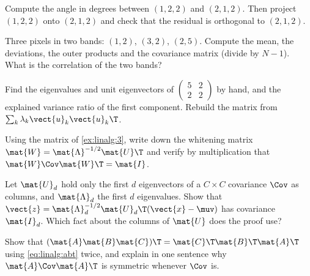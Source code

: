\begin{checkyourself}
\item\label{ex:linalg:1} Compute the angle in degrees between $(1, 2, 2)$ and $(2, 1, 2)$. Then
  project $(1, 2, 2)$ onto $(2, 1, 2)$ and check that the residual is orthogonal to $(2, 1, 2)$.
\item\label{ex:linalg:2} Three pixels in two bands: $(1, 2)$, $(3, 2)$, $(2, 5)$. Compute the
  mean, the deviations, the outer products and the covariance matrix (divide by $N - 1$). What is
  the correlation of the two bands?
\item\label{ex:linalg:3} Find the eigenvalues and unit eigenvectors of
  $\begin{pmatrix} 5 & 2\\ 2 & 2\end{pmatrix}$ by hand, and the explained variance ratio of the
  first component. Rebuild the matrix from $\sum_k \lambda_k\vect{u}_k\vect{u}_k\T$.
\item\label{ex:linalg:4} Using the matrix of \cref{ex:linalg:3}, write down the whitening matrix
  $\mat{W} = \mat{\Lambda}^{-1/2}\mat{U}\T$ and verify by multiplication that
  $\mat{W}\Cov\mat{W}\T = \mat{I}$.
\item\label{ex:linalg:5} Let $\mat{U}_d$ hold only the first $d$ eigenvectors of a $C\times C$
  covariance $\Cov$ as columns, and $\mat{\Lambda}_d$ the first $d$ eigenvalues. Show that
  $\vect{z} = \mat{\Lambda}_d^{-1/2}\mat{U}_d\T(\vect{x} - \muv)$ has covariance $\mat{I}_d$. Which
  fact about the columns of $\mat{U}$ does the proof use?
\item\label{ex:linalg:6} Show that $(\mat{A}\mat{B}\mat{C})\T = \mat{C}\T\mat{B}\T\mat{A}\T$ using
  \cref{eq:linalg:abt} twice, and explain in one sentence why $\mat{A}\Cov\mat{A}\T$ is symmetric
  whenever $\Cov$ is.
\end{checkyourself}

